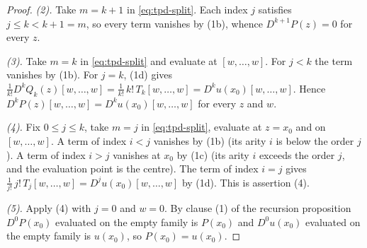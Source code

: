 \begin{proof}
\emph{(2).}  Take $m=k+1$ in \eqref{eq:tpd-split}.  Each index $j$ satisfies $j\le k<k+1=m$, so
every term vanishes by (1b), whence $D^{k+1}P(z)=0$ for every $z$.

\emph{(3).}  Take $m=k$ in \eqref{eq:tpd-split} and evaluate at $[w,\ldots,w]$.  For $j<k$ the
term vanishes by (1b).  For $j=k$, (1d) gives
$\frac{1}{k!}D^{k}Q_k(z)[w,\ldots,w]=\frac{1}{k!}\,k!\,T_k[w,\ldots,w]=D^{k}u(x_0)[w,\ldots,w]$.
Hence $D^{k}P(z)[w,\ldots,w]=D^{k}u(x_0)[w,\ldots,w]$ for every $z$ and $w$.

\emph{(4).}  Fix $0\le j\le k$, take $m=j$ in \eqref{eq:tpd-split}, evaluate at $z=x_0$ and on
$[w,\ldots,w]$.  A term of index $i<j$ vanishes by (1b) (its arity $i$ is below the order $j$).
A term of index $i>j$ vanishes at $x_0$ by (1c) (its arity $i$ exceeds the order $j$, and the
evaluation point is the centre).  The term of index $i=j$ gives
$\frac{1}{j!}\,j!\,T_j[w,\ldots,w]=D^{j}u(x_0)[w,\ldots,w]$ by (1d).  This is assertion (4).

\emph{(5).}  Apply (4) with $j=0$ and $w=0$.  By clause (1) of the recursion proposition
$D^{0}P(x_0)$ evaluated on the empty family is $P(x_0)$ and $D^{0}u(x_0)$ evaluated on the
empty family is $u(x_0)$, so $P(x_0)=u(x_0)$.
\end{proof}
